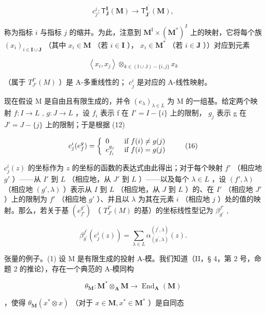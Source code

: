 \[
c _ {j} ^ {i} \colon \mathsf {T} _ {\mathbf {J}} ^ {\mathbf {I}} (\mathbf {M}) \to \mathsf {T} _ {\mathbf {J} ^ {\prime}} ^ {\mathbf {I} ^ {\prime}} (\mathbf {M}),
\]

称为指标 \(i\) 与指标 \(j\) 的缩并。为此，注意到 \(\mathbf{M}^{\mathrm{I}} \times (\mathbf{M}^{*})^{\mathrm{J}}\) 上的映射，它将每个族 \((x_{i})_{i \in \mathbf{I} \cup \mathbf{J}}\) （其中 \(x_{i} \in \mathbf{M}\) （若 \(i \in \mathbf{I}\) ）， \(x_{i} \in \mathbf{M}^{*}\) （若 \(i \in \mathbf{J}\) ））对应到元素

\[
\left\langle x _ {i}, x _ {j} \right\rangle \otimes_ {k \in (\mathbb {I} \cup \mathbb {J}) - \{i, j \}} x _ {k}\tag{15}
\]

（属于 \(T_{J'}^{I'}(M)\) ）是 A-多重线性的； \(c_{j}^{i}\) 是对应的 A-线性映射。

现在假设 M 是自由且有限生成的，并令 \((e_{\lambda})_{\lambda \in L}\) 为 M 的一组基。给定两个映射 \(f: I \to L\) , \(g: J \to L\) ，设 \(f_i\) 表示 f 在 \(I' = I - \{i\}\) 上的限制， \(g_j\) 表示 g 在 \(J' = J - \{j\}\) 上的限制；于是根据 (12)

\[
c _ {j} ^ {i} (e _ {f} ^ {g}) = \left\{ \begin{array}{l l} 0 & \text { if } f (i) \neq g (j) \\ e _ {f _ {i}} ^ {g _ {j}} & \text { if } f (i) = g (j) \end{array} \right.\tag{16}
\]

\(c_j^i(z)\) 的坐标作为 \(z\) 的坐标的函数的表达式由此得出；对于每个映射 \(f'\) （相应地 \(g'\) ）——从 \(I'\) 到 \(L\) （相应地，从 \(J'\) 到 \(L\) ）——以及每个 \(\lambda \in L\) ，设 \((f', \lambda)\) （相应地 \((g', \lambda)\) ）表示从 \(I\) 到 \(L\) （相应地，从 \(J\) 到 \(L\) ）的、在 \(I'\) （相应地 \(J'\) ）上的限制为 \(f'\) （相应地 \(g'\) ）、并且以 \(\lambda\) 为其在元素 \(i\) （相应地 \(j\) ）处的值的映射。那么，若关于基 \((e_{f'}^{g'})\) （ \(T_{J'}^{I'}(M)\) 的基）的坐标线性型记为 \(\beta_{g'}^{f'}\) ,

\[
\beta_ {g ^ {\prime}} ^ {f ^ {\prime}} (c _ {j} ^ {i} (z)) = \sum_ {\lambda \in L} \alpha_ {(g ^ {\prime}, \lambda)} ^ {(f ^ {\prime}, \lambda)} (z).\tag{17}
\]

张量的例子。(1) 设 M 是有限生成的投射 A-模。我们知道（II，§ 4，第 2 号，命题 2 的推论），存在一个典范的 A-模同构

\[
\theta_ {\mathbf {M}} \colon \mathbf {M} ^ {*} \otimes_ {\mathbf {A}} \mathbf {M} \rightarrow \operatorname{End} _ {\mathbf {A}} (\mathbf {M})
\]

，使得 \(\theta_{\mathbf{M}}(x^{*}\otimes x)\) （对于 \(x\in \mathbf{M},x^{*}\in \mathbf{M}^{*}\) ）是自同态

